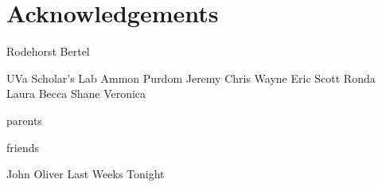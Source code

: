 
\section*{Acknowledgements} %
\label{cha:acknowledgements}

Rodehorst
Bertel

UVa Scholar's Lab
Ammon
Purdom
Jeremy
Chris
Wayne
Eric
Scott
Ronda
Laura
Becca
Shane
Veronica

parents

friends

John Oliver Last Weeks Tonight

